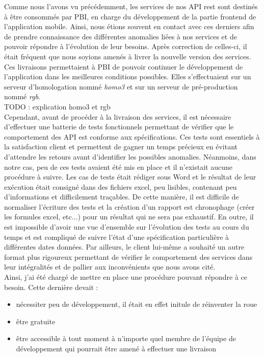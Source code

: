 	Comme nous l'avons vu précédemment, les services de nos API rest sont destinés à être consommés par PBI, en charge du développement de la partie frontend de l'application mobile. Ainsi, nous étions souvent en contact avec ces derniers afin de prendre connaissance des différentes anomalies liées à nos services et de pouvoir répondre à l'évolution de leur besoins. Après correction de celles-ci, il était fréquent que nous soyions amenés à livrer la nouvelle version des services. Ces livraisons permettaient à PBI de pouvoir continuer le développement de l'application dans les meilleures conditions possibles. Elles s'effectuaient sur un serveur d'homologation nommé \textit{homo3} et sur un serveur de pré-production nommé \textit{rgb}. \\
	
	TODO : explication homo3 et rgb\\
	
	Cependant, avant de procéder à la livraison des services, il est nécessaire d'effectuer une batterie de tests fonctionnels permettant de vérifier que le comportement des API est conforme aux spécifications. Ces tests sont essentiels à la satisfaction client et permettent de gagner un temps précieux en évitant d'attendre les retours avant d'identifier les possibles anomalies. Néanmoins, dans notre cas, peu de ces tests avaient été mis en place et il n'existait aucune procédure à suivre. Les cas de tests était rédiger sous Word et le résultat de leur exécution était consigné dans des fichiers excel, peu lisibles, contenant peu d'informations et difficilement traçables. De cette manière, il est difficile de normaliser l'écriture des tests et la création d'un rapport est chronophage (créer les formules excel, etc...) pour un résultat qui ne sera pas exhaustif. En outre, il est impossible d'avoir une vue d'ensemble sur l'évolution des tests au cours du temps et est compliqué de suivre l'état d'une spécification particulière à différentes dates données. Par ailleurs, le client lui-même a souhaité un autre format plus rigoureux permettant de vérifier le comportement des services dans leur intégralités et de pallier aux inconvénients que nous avons cité. \\
	
	Ainsi, j'ai été chargé de mettre en place une procédure pouvant répondre à ce besoin. Cette dernière devait :
	\begin{itemize}
		\item nécessiter peu de développement, il était en effet initule de réinventer la roue
		\item être gratuite
		\item être accessible à tout moment à n'importe quel membre de l'équipe de développement qui pourrait être amené à effectuer une livraison
	\end{itemize}
	